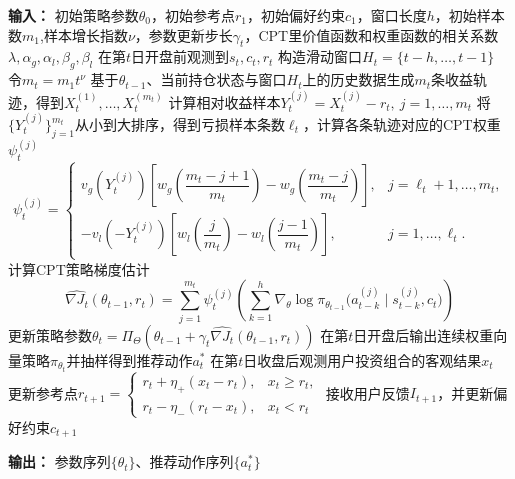 \begin{algorithm}[H]
\caption{基于动态参考点的CPT-PG在线优化器}
\begin{algorithmic}[1]
\STATE \textbf{输入：} 初始策略参数$\theta_0$，初始参考点$r_1$，初始偏好约束$c_1$，窗口长度$h$，初始样本数$m_1$,样本增长指数$\nu$，参数更新步长$\gamma_t$，CPT里价值函数和权重函数的相关系数$\lambda,\alpha_g,\alpha_l,\beta_g,\beta_l$
    \STATE 在第$t$日开盘前观测到$s_t,c_t,r_t$
    \STATE 构造滑动窗口$H_t=\{t-h,\dots,t-1\}$
    \STATE 令$m_t=m_1 t^{\nu}$
    \STATE 基于$\theta_{t-1}$、当前持仓状态与窗口$H_t$上的历史数据生成$m_t$条收益轨迹，得到$X_t^{(1)},\dots,X_t^{(m_t)}$
    \STATE 计算相对收益样本$Y_t^{(j)}=X_t^{(j)}-r_t,\ j=1,\dots,m_t$
    \STATE 将$\{Y_t^{(j)}\}_{j=1}^{m_t}$从小到大排序，得到亏损样本条数$\ell_t$，计算各条轨迹对应的CPT权重$\psi_t^{(j)}$
    \begin{equation*}
\psi_t^{(j)}
=
\begin{cases}
v_g\!\left(Y_t^{(j)}\right)
\left[
w_g\!\left(\dfrac{m_t-j+1}{m_t}\right)
-
w_g\!\left(\dfrac{m_t-j}{m_t}\right)
\right], & j=\ell_t+1,\dots,m_t, \\[1.2ex]
-
v_l\!\left(-Y_t^{(j)}\right)
\left[
w_l\!\left(\dfrac{j}{m_t}\right)
-
w_l\!\left(\dfrac{j-1}{m_t}\right)
\right], & j=1,\dots,\ell_t.
\end{cases}
\end{equation*}
    \STATE 计算CPT策略梯度估计
    \begin{equation*}
    \widehat{\nabla J_t}(\theta_{t-1},r_t)
    =
    \sum_{j=1}^{m_t}
    \psi_t^{(j)}
    \left(
    \sum_{k=1}^{h}
    \nabla_{\theta}
    \log \pi_{\theta_{t-1}}
    \bigl(
    a_{t-k}^{(j)} \mid s_{t-k}^{(j)}, c_t
    \bigr)
    \right)
    \end{equation*}
    \STATE 更新策略参数$
    \theta_t
    =
    \Pi_{\Theta}
    \left(
    \theta_{t-1}
    +
    \gamma_t
    \widehat{\nabla J_t}(\theta_{t-1},r_t)
    \right)
    $
    \STATE 在第$t$日开盘后输出连续权重向量策略$\pi_{\theta_t}$并抽样得到推荐动作$a_t^*$
    \STATE 在第$t$日收盘后观测用户投资组合的客观结果$x_t$
    \STATE 更新参考点$
    r_{t+1}
    =
    \begin{cases}
    r_t+\eta_+\left(x_t-r_t\right), & x_t\ge r_t,\\[4pt]
    r_t-\eta_-\left(r_t-x_t\right), & x_t<r_t
    \end{cases}
    $
    \STATE 接收用户反馈$I_{t+1}$，并更新偏好约束$c_{t+1}$

\ENDFOR
\STATE \textbf{输出：} 参数序列$\{\theta_t\}$、推荐动作序列$\{a_t^*\}$
\end{algorithmic}
\end{algorithm}
